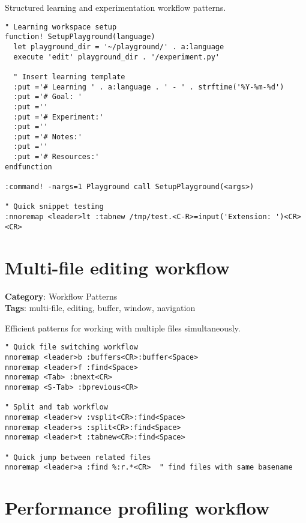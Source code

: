 {{{{{{{{{{{{{{{{{{Structured learning and experimentation workflow patterns.

\begin{Exa*}{}
\begin{Verbatim}[fontsize=\footnotesize, breaklines, breakanywhere]
" Learning workspace setup
function! SetupPlayground(language)
  let playground_dir = '~/playground/' . a:language
  execute 'edit' playground_dir . '/experiment.py'
  
  " Insert learning template
  :put ='# Learning ' . a:language . ' - ' . strftime('%Y-%m-%d')
  :put ='# Goal: '
  :put =''
  :put ='# Experiment:'
  :put =''
  :put ='# Notes:'
  :put =''
  :put ='# Resources:'
endfunction

:command! -nargs=1 Playground call SetupPlayground(<args>)

" Quick snippet testing
:nnoremap <leader>lt :tabnew /tmp/test.<C-R>=input('Extension: ')<CR><CR>
\end{Verbatim}
\end{Exa*}

\section{Multi-file editing workflow}

\textbf{Category}: Workflow Patterns\\ \textbf{Tags}: multi-file, editing, buffer, window, navigation
\vspace{0.5cm}

Efficient patterns for working with multiple files simultaneously.

\begin{Exa*}{}
\begin{Verbatim}[fontsize=\footnotesize, breaklines, breakanywhere]
" Quick file switching workflow
nnoremap <leader>b :buffers<CR>:buffer<Space>
nnoremap <leader>f :find<Space>
nnoremap <Tab> :bnext<CR>
nnoremap <S-Tab> :bprevious<CR>

" Split and tab workflow
nnoremap <leader>v :vsplit<CR>:find<Space>
nnoremap <leader>s :split<CR>:find<Space>  
nnoremap <leader>t :tabnew<CR>:find<Space>

" Quick jump between related files
nnoremap <leader>a :find %:r.*<CR>  " find files with same basename
\end{Verbatim}
\end{Exa*}

\section{Performance profiling workflow}

}}}}}}}}}}}}}}}}}}
